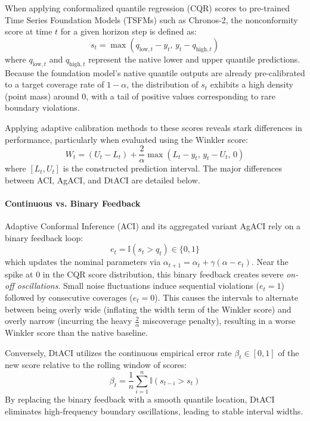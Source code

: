 \label{subsec:conformal_comparison}

When applying conformalized quantile regression (CQR) scores to pre-trained Time Series Foundation Models (TSFMs) such as Chronos-2, the nonconformity score at time \(t\) for a given horizon step is defined as:
\begin{equation}
	s_t = \max(q_{\text{low}, t} - y_t, \, y_t - q_{\text{high}, t})
\end{equation}
where \(q_{\text{low}, t}\) and \(q_{\text{high}, t}\) represent the native lower and upper quantile predictions. Because the foundation model's native quantile outputs are already pre-calibrated to a target coverage rate of \(1-\alpha\), the distribution of \(s_t\) exhibits a high density (point mass) around \(0\), with a tail of positive values corresponding to rare boundary violations.

Applying adaptive calibration methods to these scores reveals stark differences in performance, particularly when evaluated using the Winkler score:
\begin{equation}
	W_t = (U_t - L_t) + \frac{2}{\alpha} \max(L_t - y_t, \, y_t - U_t, \, 0)
\end{equation}
where \([L_t, U_t]\) is the constructed prediction interval. The major differences between ACI, AgACI, and DtACI are detailed below.

\paragraph{Continuous vs. Binary Feedback}
Adaptive Conformal Inference (ACI) \cite{aci} and its aggregated variant AgACI \cite{agaci} rely on a binary feedback loop:
\begin{equation}
	e_t = \mathbb{I}(s_t > q_t) \in \{0, 1\}
\end{equation}
which updates the nominal parameters via \(\alpha_{t+1} = \alpha_t + \gamma (\alpha - e_t)\). Near the spike at \(0\) in the CQR score distribution, this binary feedback creates severe \textit{on-off oscillations}. Small noise fluctuations induce sequential violations (\(e_t=1\)) followed by consecutive coverages (\(e_t=0\)). This causes the intervals to alternate between being overly wide (inflating the width term of the Winkler score) and overly narrow (incurring the heavy \(\frac{2}{\alpha}\) miscoverage penalty), resulting in a worse Winkler score than the native baseline.

Conversely, DtACI \cite{dtaci} utilizes the continuous empirical error rate \(\beta_t \in [0,1]\) of the new score relative to the rolling window of scores:
\begin{equation}
	\beta_t = \frac{1}{n} \sum_{i=1}^n \mathbb{I}(s_{t-i} > s_t)
\end{equation}
By replacing the binary feedback with a smooth quantile location, DtACI eliminates high-frequency boundary oscillations, leading to stable interval widths.

